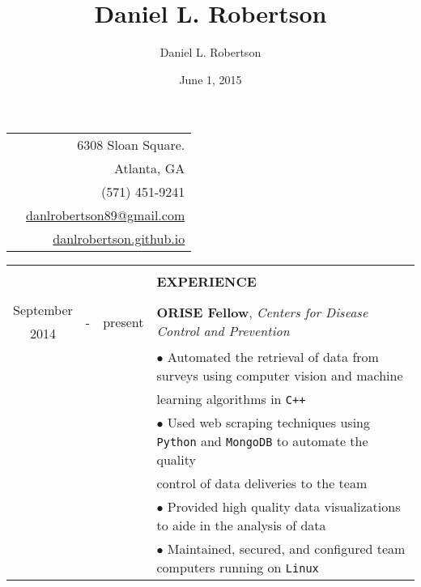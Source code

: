 \documentclass[10pt]{article}
\title{Daniel L. Robertson}
\date{June 1, 2015}
\author{Daniel L. Robertson}
\begin{document}
    \normalfont
    \begin{table}[ht]
        \begin{tabular}{p{13cm}r}
            \multirow{5}{*}{\hspace*{1cm}\color{maroon}{\huge\textbf{Daniel L. Robertson}}} & 6308 Sloan Square.\\
            & Atlanta, GA\\
            & (571) 451-9241\\
            & \href{mailto:danlrobertson89@gmail.com}{danlrobertson89@gmail.com}\\
            & \href{http://danlrobertson.github.io}{danlrobertson.github.io}\\
        \end{tabular}
        \begin{tabular}{@{\hspace{0mm}}c@{\hspace{1mm}}c@{\hspace{3mm}}cl}
            & & & \color{maroon}{\rule{14cm}{0.75pt}}\\
            & & & \large{\textbf{EXPERIENCE}}\\
            & & & \color{maroon}{\rule{14cm}{0.75pt}}\\
            September & \multirow{2}{*}{-} & \multirow{2}{*}{present} & \multirow{2}{*}{\textbf{ORISE Fellow}, \textit{Centers for Disease Control and Prevention}}\\
            2014 & & &\\
            & & & $\bullet$ Automated the retrieval of data from surveys using computer vision and machine\\
            & & & \hspace*{4mm}learning algorithms in \texttt{C++}\\
            & & & $\bullet$ Used web scraping techniques using \texttt{Python} and \texttt{MongoDB} to automate the quality\\
            & & & \hspace*{4mm}control of data deliveries to the team\\
            & & & $\bullet$ Provided high quality data visualizations to aide in the analysis of data\\
            & & & $\bullet$ Maintained, secured, and configured team computers running on \texttt{Linux}\\

\end{tabular}
\end{table}
\end{document}
